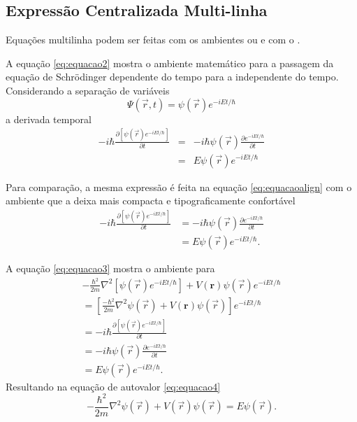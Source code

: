 \documentclass[12pt,a4paper,oneside,linenumbers=off,latinmodern=off,timesnews=off,spanish,english,portuges]{rctart-class/rctart}
\begin{document}
\subsection{Expressão Centralizada Multi-linha}

        Equações multilinha podem ser feitas com os ambientes  ou  e com o . 
        
        A equação \eqref{eq:equacao2} mostra o ambiente matemático   para a passagem da equação de Schrödinger dependente do tempo para a independente do tempo. Considerando a separação de variáveis 
        $$\Psi(\vec r,t)=\psi(\vec r)e^{-iEt/\hbar}$$
        a derivada temporal 
        \begin{eqnarray}\label{eq:equacao2}
         -i\hbar\frac{\partial\left[\psi\left(\vec{r}\right)e^{-iEt/\hbar}\right]}{\partial t}&=&-i\hbar\psi\left(\vec{r}\right)\frac{\partial e^{-iEt/\hbar}}{\partial t}\nonumber\\
         &=&E\psi\left(\vec{r}\right)e^{-iEt/\hbar}
        \end{eqnarray}
        
        Para comparação, a mesma expressão é feita na equação \eqref{eq:equacaoalign} com o ambiente  que a deixa mais compacta e tipograficamente confortável
        \begin{align}\label{eq:equacaoalign}
         -i\hbar\frac{\partial\left[\psi\left(\vec{r}\right)e^{-iEt/\hbar}\right]}{\partial t}&=-i\hbar\psi\left(\vec{r}\right)\frac{\partial e^{-iEt/\hbar}}{\partial t}\nonumber\\
         &=E\psi\left(\vec{r}\right)e^{-iEt/\hbar}.
        \end{align}

        
        A  equação \eqref{eq:equacao3} mostra o ambiente  para 
         \begin{multline} \label{eq:equacao3}
            -\frac{\hbar^2}{2m}\nabla^2\left[\psi(\vec r)e^{-iEt/\hbar}\right] + V(\mathbf{r})\psi(\vec r)e^{-iEt/\hbar} \\
            =\left[\frac{-\hbar^2}{2m}\nabla^2\psi(\vec r) + V(\mathbf{r})\psi(\vec r)\right]e^{-iEt/\hbar} \\
            = -i\hbar \frac{\partial\left[\psi(\vec r)e^{-iEt/\hbar}\right]}{\partial t}\\
            = -i\hbar \psi(\vec r)\frac{\partial e^{-iEt/\hbar}}{\partial t}\\
            = E \psi(\vec r) e^{-iEt/\hbar}.
        \end{multline}
        Resultando na equação de autovalor \eqref{eq:equacao4}
        \begin{equation}\label{eq:equacao4}
         -\frac{\hbar^{2}}{2m}\nabla^{2}\psi\left(\vec{r}\right)+V\left(\vec{r}\right)\psi(\vec{r})=E\psi\left(\vec{r}\right).
        \end{equation}
\end{document}
